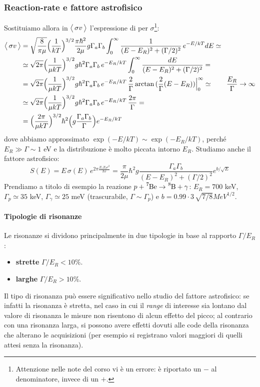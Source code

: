 \subsubsection{Reaction-rate e fattore astrofisico}
Sostituiamo allora in $\bigl\langle\, \sigma v\, \bigr\rangle$ l'espressione di \BW{} per $\sigma$\footnote{Attenzione nelle note del corso vi è un errore: è riportato un $-$ al denominatore, invece di un $+$.}:
\begin{displaymath}
\begin{aligned}
\bigl\langle\, \sigma v\, \bigr\rangle &= \sqrt{\frac{8}{\pi\mu}} \Bigl ( \frac{1}{kT} \Bigr )^{3/2} \frac{\pi\hbar^2}{2\mu} g \Gamma_a\Gamma_b \int_0^\infty \frac{1}{(E-E_R)^2 + (\Gamma/2)^2} \, e^{-E/kT} dE \simeq \\
&\simeq \sqrt{2\pi}\Bigl ( \frac{1}{\mu kT} \Bigr )^{3/2} g\hbar^2 \Gamma_a\Gamma_b\, e^{-E_R/kT} \int_0^\infty \frac{dE}{(E-E_R)^2 + (\Gamma/2)^2} =\\
&= \sqrt{2\pi}\Bigl ( \frac{1}{\mu kT} \Bigr )^{3/2} g\hbar^2 \Gamma_a\Gamma_b\, e^{-E_R/kT} \,\frac{2}{\Gamma} \arctan{(\frac{2}{\Gamma}(E-E_R))}\Bigr |_{0}^\infty \simeq \qquad \frac{E_R}{\Gamma}\to \infty \\
&\simeq \sqrt{2\pi}\Bigl ( \frac{1}{\mu kT} \Bigr )^{3/2} g\hbar^2 \Gamma_a\Gamma_b\, e^{-E_R/kT} \, \frac{2\pi}{\Gamma} = \\
&= \Bigl ( \frac{2\pi}{\mu kT} \Bigr )^{3/2} \hbar^2 \Bigl ( g\frac{\Gamma_a\Gamma_b}{\Gamma} \Bigr )e^{-E_R/kT}
\end{aligned}
\end{displaymath}
dove abbiamo approssimato $\exp{(-E/kT)}\sim \exp{(-E_R/kT)}$, perché $E_R\gg \Gamma \sim 1$ eV e la distribuzione è molto piccata intorno $E_R$. Studiamo anche il fattore astrofisico:
$$S(E)=E\, \sigma(E) \, e^{2\pi\frac{Z_1Z_2e^2}{\hbar v}}= \frac{\pi}{2\mu} \hbar^2 g \frac{\Gamma_a\Gamma_b}{(E-E_R)^2+(\Gamma/2)^2}e^{b/\sqrt{E}}$$
Prendiamo a titolo di esempio la reazione $p+\ce{^7Be}\to \ce{^8B} +\gamma$: $E_R=700$ keV, $\Gamma_p \simeq 35$ keV, $\Gamma_\gamma \simeq 25$ meV (trascurabile, $\Gamma \sim \Gamma_p$) e $b=0.99\cdot 3\,\sqrt{7/8}\unit{MeV}^{1/2}$. 

\paragraph{Tipologie di risonanze} Le risonanze si dividono principalmente in due tipologie in base al rapporto $\Gamma/E_R$:
\begin{itemize}
    \item \textbf{strette} $\Gamma/E_R<10\%$.
    \item \textbf{larghe} $\Gamma/E_R>10\%$.
\end{itemize}
Il tipo di risonanza può essere significativo nello studio del fattore astrofisico: se infatti la risonanza è stretta, nel caso in cui il \textit{range} di interesse sia lontano dal valore di risonanza le misure non risentono di alcun effetto del picco; al contrario con una risonanza larga, si possono avere effetti dovuti alle code della risonanza che alterano le acquisizioni (per esempio si registrano valori maggiori di quelli attesi senza la risonanza).

